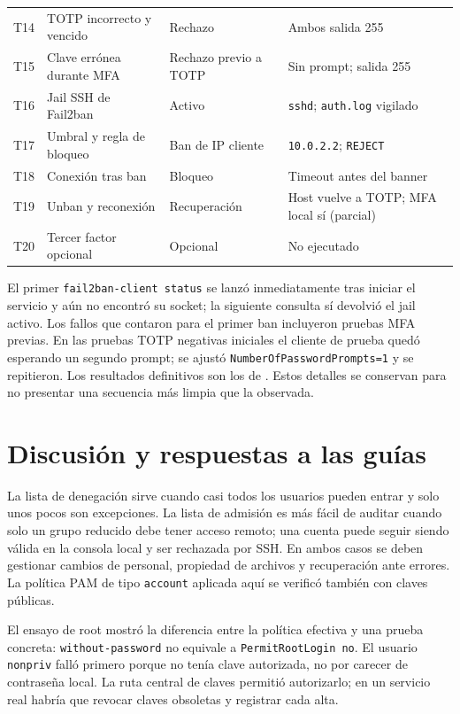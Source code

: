 \documentclass[11pt,a4paper]{article}
\begin{document}
\begin{longtable}{>{\raggedright\arraybackslash}p{}>{\raggedright\arraybackslash}p{}>{\raggedright\arraybackslash}p{}>{\raggedright\arraybackslash}p{}}
T14 & TOTP incorrecto y vencido & Rechazo & Ambos salida 255 \\
T15 & Clave errónea durante MFA & Rechazo previo a TOTP & Sin prompt; salida 255 \\
T16 & Jail SSH de Fail2ban & Activo & \texttt{sshd}; \texttt{auth.log} vigilado \\
T17 & Umbral y regla de bloqueo & Ban de IP cliente & \texttt{10.0.2.2}; \texttt{REJECT} \\
T18 & Conexión tras ban & Bloqueo & Timeout antes del banner \\
T19 & Unban y reconexión & Recuperación & Host vuelve a TOTP; MFA local sí (parcial) \\
T20 & Tercer factor opcional & Opcional & No ejecutado \\
\end{longtable}
\setlength{\tabcolsep}{6pt}
\normalsize

El primer \texttt{fail2ban-client status} se lanzó inmediatamente tras iniciar
el servicio y aún no encontró su socket; la siguiente consulta sí devolvió el
jail activo. Los fallos que contaron para el primer ban incluyeron pruebas MFA
previas. En las pruebas TOTP negativas iniciales el cliente de prueba quedó
esperando un segundo prompt; se ajustó
\texttt{NumberOfPasswordPrompts=1} y se repitieron. Los resultados definitivos
son los de . Estos detalles se
conservan para no presentar una secuencia más limpia que la observada.

\section{Discusión y respuestas a las guías}
La lista de denegación sirve cuando casi todos los usuarios pueden entrar y
solo unos pocos son excepciones. La lista de admisión es más fácil de auditar
cuando solo un grupo reducido debe tener acceso remoto; una cuenta puede
seguir siendo válida en la consola local y ser rechazada por SSH. En ambos
casos se deben gestionar cambios de personal, propiedad de archivos y
recuperación ante errores. La política PAM de tipo \texttt{account} aplicada
aquí se verificó también con claves públicas.

El ensayo de root mostró la diferencia entre la política efectiva y una
prueba concreta: \texttt{without-password} no equivale a
\texttt{PermitRootLogin no}. El usuario \texttt{nonpriv} falló primero porque
no tenía clave autorizada, no por carecer de contraseña local. La ruta central
de claves permitió autorizarlo; en un servicio real habría que revocar claves
obsoletas y registrar cada alta.
\end{document}
